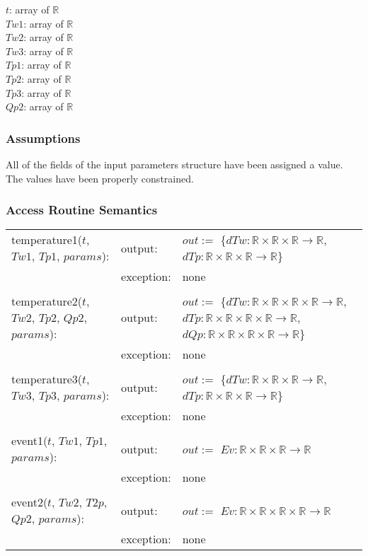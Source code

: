 \documentclass[12pt]{article}
\begin{document}
$t$: array of $\mathbb{R}$ \\
$Tw1$: array of $\mathbb{R}$ \\
$Tw2$: array of $\mathbb{R}$ \\
$Tw3$: array of $\mathbb{R}$ \\
$Tp1$: array of $\mathbb{R}$ \\
$Tp2$: array of $\mathbb{R}$ \\
$Tp3$: array of $\mathbb{R}$ \\
$Qp2$: array of $\mathbb{R}$ 

\subsubsection{Assumptions}

All of the fields of the input parameters structure have been assigned a
value. The values have been properly constrained.

\subsubsection{Access Routine Semantics}

\begin{center}
\begin{tabular}{l l p{6cm}}
temperature1($t$, $Tw1$, $Tp1$, $params$): & output: & $out :=$ \{$dTw: \mathbb{R} \times \mathbb{R} \times \mathbb{R} \rightarrow \mathbb{R}$, $dTp: \mathbb{R} \times \mathbb{R} \times \mathbb{R} \rightarrow \mathbb{R}$\} \\
& exception: & none \\ \\
temperature2($t$, $Tw2$, $Tp2$, $Qp2$, $params$): & output: & $out :=$ \{$dTw: \mathbb{R} \times \mathbb{R} \times \mathbb{R} \times \mathbb{R} \rightarrow \mathbb{R}$, $dTp: \mathbb{R} \times \mathbb{R} \times \mathbb{R} \times \mathbb{R} \rightarrow \mathbb{R}$, $dQp: \mathbb{R} \times \mathbb{R} \times \mathbb{R} \times \mathbb{R} \rightarrow \mathbb{R}$\} \\
& exception: & none \\ \\
temperature3($t$, $Tw3$, $Tp3$, $params$): & output: & $out :=$ \{$dTw: \mathbb{R} \times \mathbb{R} \times \mathbb{R} \rightarrow \mathbb{R}$, $dTp: \mathbb{R} \times \mathbb{R} \times \mathbb{R} \rightarrow \mathbb{R}$\} \\
& exception: & none \\ \\
event1($t$, $Tw1$, $Tp1$, $params$): & output: & $out :=$ $Ev: \mathbb{R} \times \mathbb{R} \times \mathbb{R} \rightarrow \mathbb{R}$ \\ 
& exception: & none \\ \\
event2($t$, $Tw2$, $T2p$, $Qp2$, $params$): & output: & $out :=$ $Ev: \mathbb{R} \times \mathbb{R} \times \mathbb{R} \times \mathbb{R} \rightarrow \mathbb{R}$ \\
& exception: & none \\
\end{tabular}
\end{center}
\end{document}
